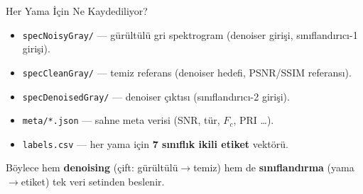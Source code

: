 \documentclass[aspectratio=169]{beamer}
\begin{document}
\begin{frame}{Her Yama İçin Ne Kaydediliyor?}
  \begin{itemize}
    \item \texttt{specNoisyGray/} — gürültülü gri spektrogram (denoiser girişi,
          sınıflandırıcı-1 girişi).
    \item \texttt{specCleanGray/} — temiz referans (denoiser hedefi, PSNR/SSIM referansı).
    \item \texttt{specDenoisedGray/} — denoiser çıktısı (sınıflandırıcı-2 girişi).
    \item \texttt{meta/*.json} — sahne meta verisi (SNR, tür, $F_c$, PRI \dots).
    \item \texttt{labels.csv} — her yama için \textbf{7 sınıflık ikili etiket} vektörü.
  \end{itemize}
  \vfill
  \begin{center}\small
    Böylece hem \textbf{denoising} (çift: gürültülü$\rightarrow$temiz) hem de
    \textbf{sınıflandırma} (yama$\rightarrow$etiket) tek veri setinden beslenir.
  \end{center}
\end{frame}

\end{document}
